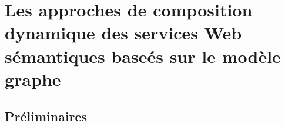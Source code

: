 \chapter{Les approches de composition dynamique des services Web sémantiques baseés sur le modèle graphe}
\newpage
\section{Préliminaires}


